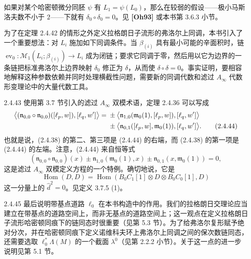 如果对某个哈密顿微分同胚 $\psi$ 有 $L_1=\psi(L_0)$，那么在较弱的假设——极小马斯洛夫数不小于 $2$——下就有 $\delta_0\circ\delta_0=0$。见 \textbf{[Oh93]} 或本书第 3.6.3 小节。

为了在定理 2.4.42 的情形之外定义拉格朗日子流形的弗洛尔上同调，本书引入了一个重要想法：对 $L_i$ 施加如下同调条件。当 $\beta_{(i)}$ 具有最小可能的辛面积时，链
$\operatorname{ev}_0:\mathcal M_1(L_i;\beta_{(i)})\to L_i$ 成为闭链；要求它同调于零，然后用以它为边界的一条链把标准弗洛尔上边界映射 $\delta_0$ 修正为 $\delta$，从而使 $\delta\circ\delta=0$。事实证明，要相容地解释这种参数依赖并同时处理横截性问题，需要新的同调代数和滤过 $A_\infty$ 代数形变理论中的大量代数工具。

\begin{remark}{2.4.43}\label{rem:2-4-43}
使用第 3.7 节引入的滤过 $A_\infty$ 双模术语，定理 2.4.36 可以写成
\begin{align}
  \bigl\langle(\mathfrak n_{0,0}\circ\mathfrak n_{0,0})
    ([\ell_p,w]),[\ell_q,w']\bigr\rangle
  ={}&\mathbin{\pm}\bigl\langle
    \mathfrak n_{1,0}(\mathfrak m_0(1),[\ell_p,w]),[\ell_q,w']
    \bigr\rangle\notag\\
  &{}\mathbin{\pm}\bigl\langle
    \mathfrak n_{0,1}([\ell_p,w],\mathfrak m_0(1)),[\ell_q,w']
    \bigr\rangle.
  \tag{2.4.44}\label{eq:2-4-44}
\end{align}
也就是说，(2.4.38) 的第二、第三项是 (2.4.44) 的右端，而 (2.4.38) 的第一项是 (2.4.44) 的左端。注意，(2.4.44) 来自恒等式
\[
  (\mathfrak n_{0,0}\circ\mathfrak n_{0,0})(x)
  \mathbin{\pm}\mathfrak n_{1,0}(\mathfrak m_0(1),x)
  \mathbin{\pm}\mathfrak n_{0,1}(x,\mathfrak m_0(1))=0,
\]
这是滤过 $A_\infty$ 双模定义方程的一个特例。确切地说，它是
\[
  \operatorname{Hom}(D,D)
  =\operatorname{Hom}(B_0C_1[1]\otimes D\otimes B_0C_0[1],D)
\]
这一分量上的 $\widehat d^2=0$。见定义 3.7.5 (1)。
\end{remark}

\begin{remark}{2.4.45}\label{rem:2-4-45}
最后说明带基点道路 $\ell_0$ 在本书构造中的作用。我们的拉格朗日交理论应当建立在带基点的道路空间上，而非无基点的道路空间上；这一观点在定义拉格朗日子流形哈密顿同痕下的链同态时很重要（见第 5.3 节）。为了给弗洛尔复形赋予绝对分次，并在哈密顿同痕下定义诺维科夫环上弗洛尔上同调之间的保次数链同态，还需要选取 $\ell_0^*\Lambda(M)$ 的一个截面 $\lambda^0$（见第 2.2.2 小节）。关于这一点的进一步说明见第 5.1 节。
\end{remark}
